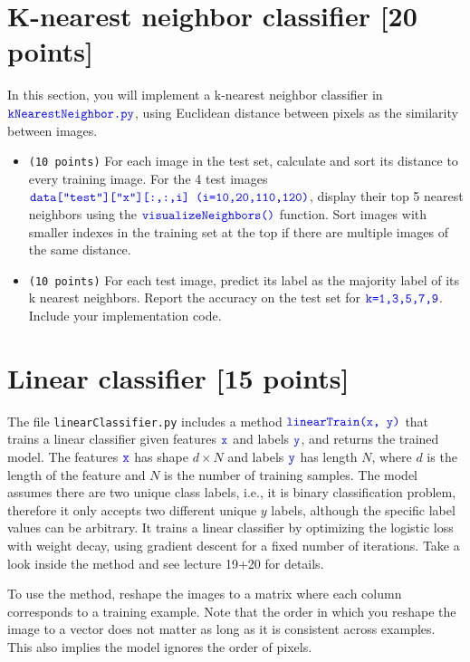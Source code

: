 \documentclass[10pt,letterpaper]{article}
\newcommand{\cmd}[1] {{\color{blue}\texttt{#1}}}
\begin{document}
\section{K-nearest neighbor classifier [20 points]}
In this section, you will implement a k-nearest neighbor classifier in $\cmd{kNearestNeighbor.py}$, 
using Euclidean distance between pixels as the similarity between images.
\begin{itemize}
	\item \cmd{(10 points)}  For each image in the test set, calculate and sort its distance to every training image.
	For the 4 test images $\cmd{data["test"]["x"][:,:,i] (i=10,20,110,120)}$, display their
	top 5 nearest neighbors using the $\cmd{visualizeNeighbors()}$ function. 
	Sort images with smaller indexes in the training set at the top if there are multiple images of the same distance.
	\item \cmd{(10 points)} For each test image, predict its label as the majority label of its k nearest neighbors.
	Report the accuracy on the test set for $\cmd{k=1,3,5,7,9}$. Include your implementation
	code. 
	
\end{itemize}


\section{Linear classifier [15 points]}
The file \cmd{linearClassifier.py} includes a method 
$\cmd{linearTrain(x, y)}$ that trains a linear classifier given
features $\cmd{x}$ and labels $\cmd{y}$, and returns the trained
model.
The features
$\cmd{x}$ has shape $d \times N$ and labels $\cmd{y}$ has length $N$,
where $d$ is the length of the feature and $N$ is the number of
training samples.
The model assumes there are two unique class labels, i.e., it is
binary classification problem, therefore it only accepts two different unique $y$ labels, 
although the specific label values can be arbitrary. 
It trains a linear classifier by optimizing the logistic loss with weight decay, 
using gradient descent for a fixed number of iterations. 
Take a look inside the method and see lecture 19+20 for details.

To use the method, reshape the images to a matrix where each column corresponds to a
training example. Note that the order in which you reshape the
  image to a vector does not matter as long as it is consistent across
  examples. This also implies the model ignores the order of pixels.
\end{document}
